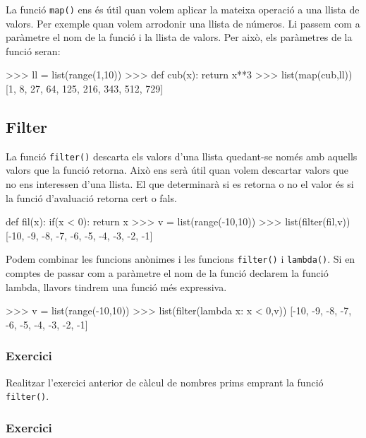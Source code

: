 La funció {\tt map()} ens és útil quan volem aplicar la mateixa operació a una llista de valors. Per exemple quan volem arrodonir una llista de números. Li passem com a paràmetre el nom de la funció i la llista de valors. Per això, els paràmetres de la funció seran:


\begin{tip}[caption=Calcular el cub d'una llista]
>>> ll = list(range(1,10))
>>> def cub(x): return x**3
>>> list(map(cub,ll))
[1, 8, 27, 64, 125, 216, 343, 512, 729]
\end{tip}



\subsection{Filter}

La funció {\tt filter()} descarta els valors d'una llista quedant-se només amb aquells valors que la funció retorna. Això ens serà útil quan volem descartar valors que no ens interessen d'una llista. El que determinarà si es retorna o no el valor és si la funció d'avaluació retorna cert o fals.


\begin{tip}[caption=Retornarn només valors negatius]
def fil(x):
     if(x < 0):
         return x    
>>> v = list(range(-10,10))
>>> list(filter(fil,v))
[-10, -9, -8, -7, -6, -5, -4, -3, -2, -1]
\end{tip}

Podem combinar les funcions anònimes i les funcions {\tt filter()} i {\tt lambda()}. Si en comptes de passar com a paràmetre el nom de la funció declarem la funció lambda, llavors tindrem una funció més expressiva.

\begin{tip}[caption=Retornarn només valors negatius]
>>> v = list(range(-10,10))
>>> list(filter(lambda x: x < 0,v))
[-10, -9, -8, -7, -6, -5, -4, -3, -2, -1]
\end{tip}



\subsubsection*{Exercici } 

Realitzar l'exercici anterior de càlcul de nombres prims emprant la funció {\tt filter()}.


\subsubsection*{Exercici } 



